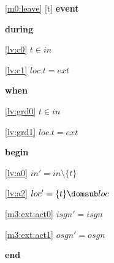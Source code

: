 \noindent \ref{m0:leave} [t] \textbf{event}
\begin{block}
\item \textbf{during}
\begin{block}
\item[ \eqref{lv:c0} ]$t \in in $ %
\item[ \eqref{lv:c1} ]$loc.t = ext $ %
\end{block}
\item \textbf{when}
\begin{block}
\item[ \eqref{lv:grd0} ]$t \in in $ %
\item[ \eqref{lv:grd1} ]$loc.t = ext $ %
\end{block}
\item \textbf{begin}
\begin{block}
\item[ \eqref{lv:a0} ]$in' = in \setminus \{ t \} $ %
\item[ \eqref{lv:a2} ]$loc' = \{ t \} \domsub loc $ %
\item[ \eqref{m3:ext:act0} ]$isgn' = isgn$ %
\item[ \eqref{m3:ext:act1} ]$osgn' = osgn$ %
\end{block}
\item \textbf{end} \\
\end{block}

